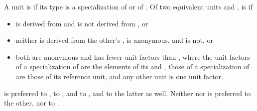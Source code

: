 \begin{itemdescr}
\pnum
A unit is  if its type is a specialization of
 or of .
Of two equivalent units  and ,  is  if
\begin{itemize}
\item
{} is derived from  and
 is not derived from , or
\item
neither is derived from the other's ,  is anonymous, and  is not, or
\item
both are anonymous and  has fewer unit factors than , where
the unit factors of a specialization of  are the elements of its
 and , those of a specialization of  are
those of its reference unit, and any other unit is one unit factor.
\end{itemize}
\begin{example}
 is preferred to ,
 to , and
 to , and
 to the latter as well.
Neither  nor  is preferred to the other,
nor  to .
\end{example}


\end{itemdescr}
